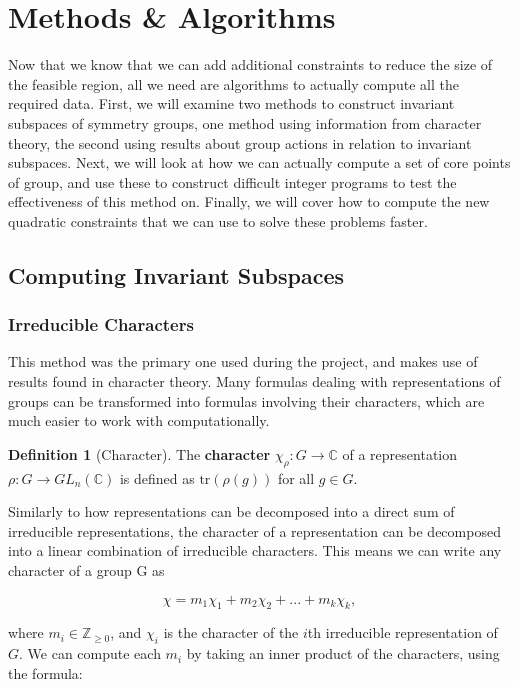 \documentclass[11pt]{article} %
\theoremstyle{definition}
\newtheorem{definition}[theorem]{Definition}
\theoremstyle{remark}
\begin{document}
\section{Methods \& Algorithms}

Now that we know that we can add additional constraints to reduce the size of the feasible region, all we need are algorithms to actually compute all the required data. First, we will examine two methods to construct invariant subspaces of symmetry groups, one method using information from character theory, the second using results about group actions in relation to invariant subspaces. Next, we will look at how we can actually compute a set of core points of group, and use these to construct difficult integer programs to test the effectiveness of this method on. Finally, we will cover how to compute the new quadratic constraints that we can use to solve these problems faster.

\subsection{Computing Invariant Subspaces}

\subsubsection{Irreducible Characters}

This method was the primary one used during the project, and makes use of results found in character theory. Many formulas dealing with representations of groups can be transformed into formulas involving their characters, which are much easier to work with computationally.

\begin{definition}[Character] 
The \textbf{character} $\chi_\rho : G \rightarrow \mathbb{C}$ of a representation $\rho : G \rightarrow GL_n(\mathbb{C})$ is defined as $\textrm{tr}(\rho(g))$ for all $g \in G$.
\end{definition}

Similarly to how representations can be decomposed into a direct sum of irreducible representations, the character of a representation can be decomposed into a linear combination of irreducible characters. This means we can write any character of a group G as

	$$ \chi = m_1\chi_1 + m_2\chi_2 + ... + m_k\chi_k, $$

where $m_i \in \mathbb{Z}_{\geq 0}$, and $\chi_i$ is the character of the $i$th irreducible representation of $G$. We can compute each $m_i$ by taking an inner product of the characters, using the formula:
\end{document}
